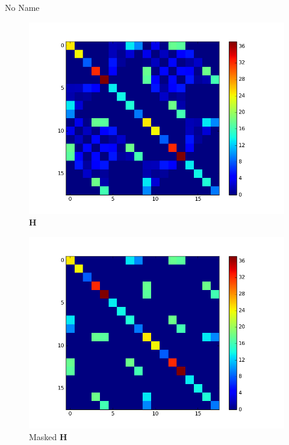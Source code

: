 \documentclass[a4paper,10pt]{article}
\begin{document}
\begin{section}{No Name}
\begin{figure}
  \includegraphics[width=\linewidth]{Hessian.png}
  \caption{$\boldsymbol{H}$}
\end{figure}

\begin{figure}
  \includegraphics[width=\linewidth]{Hessian_masked.png}
  \caption{Masked $\boldsymbol{H}$}
\end{figure}


\end{section}
\end{document}
